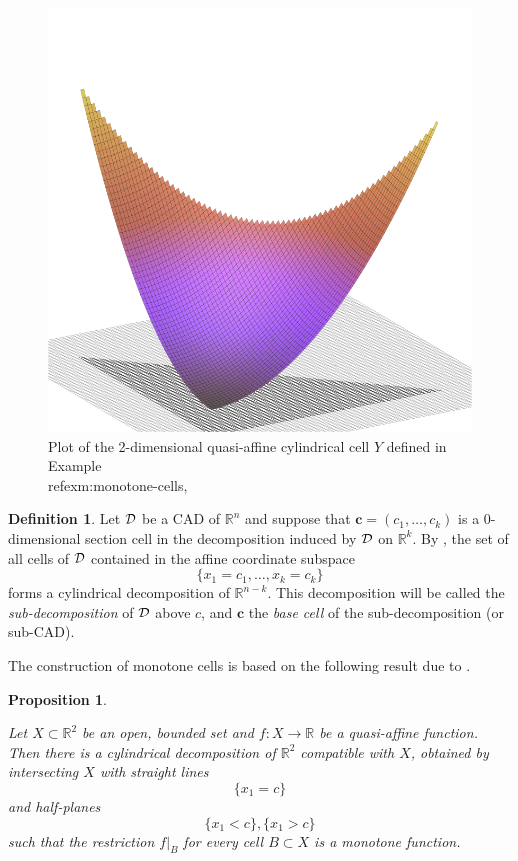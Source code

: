 \documentclass[
]{book}
\newtheorem{proposition}{Proposition}[chapter]
\theoremstyle{definition}
\newtheorem{definition}{Definition}[chapter]
\theoremstyle{definition}
\theoremstyle{definition}
\theoremstyle{definition}
\theoremstyle{remark}
\begin{document}
\begin{figure}

{\centering \includegraphics[width=0.6\linewidth]{gnuplot/qanm-surf} 

}

\caption{Plot of the 2-dimensional quasi-affine cylindrical cell $Y$ defined in Example \\ref{exm:monotone-cells},}\label{fig:unnamed-chunk-1}
\end{figure}

\begin{definition}
\protect\hypertarget{def:sub-cad}{}\label{def:sub-cad}Let \(\cal D\) be a CAD of \(\mathbb{R}^n\) and suppose that \(\mathbf{c} = (c_1,\ldots,c_k)\) is a \(0\)-dimensional section cell in the decomposition induced by \(\cal D\) on \(\mathbb{R}^k\).
By \citep[ Remark 3.8]{bgv15}, the set of all cells of \(\cal D\) contained in the affine coordinate subspace
\[
\{ x_1=c_1,\dots,x_k=c_k \}
\]
forms a cylindrical decomposition of \(\mathbb{R}^{n-k}\). This decomposition will be called the \emph{sub-decomposition} of \(\cal D\) above \(c\), and \(\mathbf{c}\) the \emph{base cell} of the sub-decomposition (or sub-CAD).
\end{definition}

The construction of monotone cells is based on the following result due to \citet{bgv15}.

\begin{proposition}
\protect\hypertarget{prp:bgv-monotone}{}\label{prp:bgv-monotone}\citep[Lemma 3.18]{bgv15}

Let \(X \subset \mathbb{R}^2\) be an open, bounded set and \(f : X \to \mathbb{R}\) be a quasi-affine function.
Then there is a cylindrical decomposition of \(\mathbb{R}^2\) compatible with \(X\), obtained by intersecting \(X\) with straight lines \[\{x_1 = c\}\] and half-planes \[\{x_1 < c\},\{x_1 > c\}\] such that the restriction \(f\vert_B\) for every cell \(B \subset X\) is a monotone function.
\end{proposition}
\end{document}
